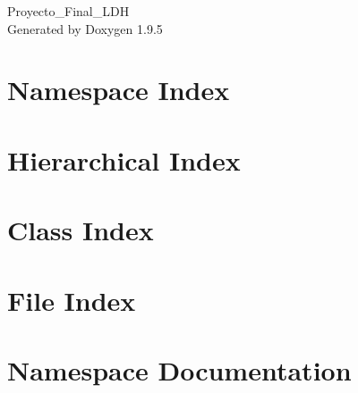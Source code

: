 \documentclass[twoside]{book}
\newcommand{\+}{\discretionary{\mbox{\scriptsize$\hookleftarrow$}}{}{}}
\newcommand{\clearemptydoublepage}{%
    \newpage{\pagestyle{empty}\cleardoublepage}%
  }
\begin{document}
  \raggedbottom
    \hypersetup{pageanchor=false,
                bookmarksnumbered=true,
                pdfencoding=unicode
               }
  \begin{titlepage}
  \vspace*{7cm}
  \begin{center}%
  {\Large Proyecto\+\_\+\+Final\+\_\+\+LDH}\\
  \vspace*{1cm}
  {\large Generated by Doxygen 1.9.5}\\
  \end{center}
  \end{titlepage}
  \clearemptydoublepage
  \tableofcontents
  \clearemptydoublepage
  \hypersetup{pageanchor=true}
\chapter{Namespace Index}

\chapter{Hierarchical Index}

\chapter{Class Index}

\chapter{File Index}

\chapter{Namespace Documentation}





\end{document}
